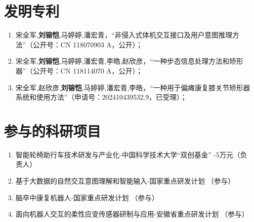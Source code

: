 \begin{publications}
\section*{发明专利}
\begin{enumerate}
\item 宋全军,\textbf{刘镕恺},马婷婷,潘宏青，“非侵入式体机交互接口及用户意图推理方法”（公开号：CN 118070903 A，公开）；
\item 宋全军,\textbf{刘镕恺},马婷婷,潘宏青,李皓,赵欣彦，“一种步态信息处理方法和矫形器”（公开号：CN 118114070 A，公开）；
\item 宋全军,赵欣彦,\textbf{刘镕恺},马婷婷,潘宏青,李皓，“一种用于偏瘫康复膝关节矫形器系统和使用方法”（申请号：202410439532.9，已受理）；
\end{enumerate}

\section*{参与的科研项目}
\begin{enumerate}
\item 智能轮椅助行车技术研发与产业化-中国科学技术大学“双创基金” -5万元（负责人）
\item 基于大数据的自然交互意图理解和智能输入-国家重点研发计划 （参与）
\item 脑卒中康复机器人-国家重点研发计划 （参与）
\item 面向机器人交互的柔性应变传感器研制与应用-安徽省重点研发计划 （参与）
\end{enumerate}

\end{publications}
